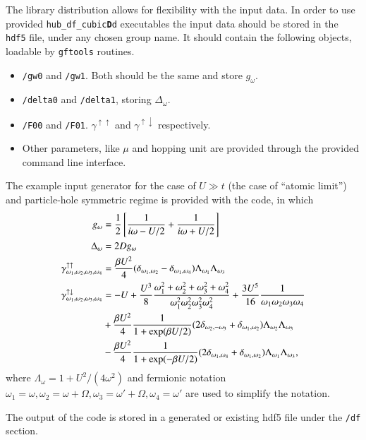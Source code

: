 \documentclass[3p,times,procedia]{elsarticle}
\begin{document}
The library distribution allows for flexibility with the input data. In order to use provided \texttt{hub\_df\_cubic{\bf D}d} executables the input data should be stored in the \texttt{hdf5} file, under any chosen group name. It should contain the following objects, loadable by \texttt{gftools} routines. 
\begin{itemize}
\item \texttt{/gw0} and \texttt{/gw1}. Both should be the same and store $g_\omega$.
\item \texttt{/delta0} and \texttt{/delta1}, storing $\Delta_\omega$.
\item \texttt{/F00} and \texttt{/F01}. $\gamma^{\uparrow\uparrow}$ and $\gamma^{\uparrow\downarrow}$ respectively.
\item Other parameters, like $\mu$ and hopping unit are provided through the provided command line interface.
\end{itemize}
The example input generator for the case of $U \gg t$ (the case of  ``atomic limit'') and particle-hole symmetric regime is provided with the code, in which 
\begin{align}
g_{\omega} & = \frac{1}{2}\left[\frac{1}{i\omega - U/2} + \frac{1}{i\omega + U/2}\right] \\
\Delta_{\omega} & = 2Dg_{\omega} \\
\gamma^{\uparrow\uparrow}_{\omega_1, \omega_2, \omega_3, \omega_4} & = \frac{\beta U^2}{4} (\delta_{\omega_1,\omega_2} - \delta_{\omega_1,\omega_4} ) \Lambda_{\omega_1}\Lambda_{\omega_3} \\
\gamma^{\uparrow\downarrow}_{\omega_1, \omega_2, \omega_3, \omega_4} & = -U + 
\frac{U^3}{8}\frac{\omega_1^2 + \omega_2^2 + \omega_3^2 + \omega_4^2}{\omega_1^2\omega_2^2\omega_3^2\omega_4^2} + \frac{3U^5}{16}\frac{1}{\omega_1\omega_2\omega_3\omega_4}  \\
& \notag + \frac{\beta U^2}{4} \frac{1}{1 + \exp(\beta U /2 )} 
(2\delta_{ \omega_2, -\omega_3} + \delta_{\omega_1, \omega_2}) 
\Lambda_{\omega_2} \Lambda_{\omega_3}  \\ 
& \notag - \frac{\beta U^2}{4} \frac{1}{1 + \exp(-\beta U /2 )} 
(2\delta_{ \omega_1, \omega_4} + \delta_{\omega_1, \omega_2}) 
\Lambda_{\omega_1} \Lambda_{\omega_3},
\end{align}
where $\Lambda_\omega = 1 + U^2/(4\omega^2)$ and fermionic notation $\omega_1 = \omega, \omega_2 = \omega + \Omega, \omega_3 = \omega' + \Omega, \omega_4 = \omega'$ are used to simplify the notation.

The output of the code is stored in a generated or existing hdf5 file under the \texttt{/df} section.
\end{document}
